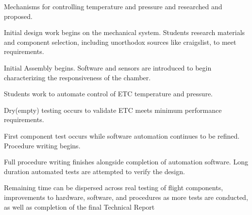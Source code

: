 \documentclass[conference]{IEEEtran} %
\begin{document}
  Mechanisms for controlling temperature and pressure and researched and proposed.

  Initial design work begins on the mechanical system. Students research materials and component selection, including unorthodox sources like craigslist, to meet requirements.

  Initial Assembly begins. Software and sensors are introduced to begin characterizing the responsiveness of the chamber.

  Students work to automate control of ETC temperature and pressure.

  Dry(empty) testing occurs to validate ETC meets minimum performance requirements.

  First component test occurs while software automation continues to be refined. Procedure writing begins.

  Full procedure writing finishes alongside completion of automation software. Long duration automated tests are attempted to verify the design.

  Remaining time can be dispersed across real testing of flight components, improvements to hardware, software, and procedures as more tests are conducted, as well as completion of the final Technical Report


\end{document}
